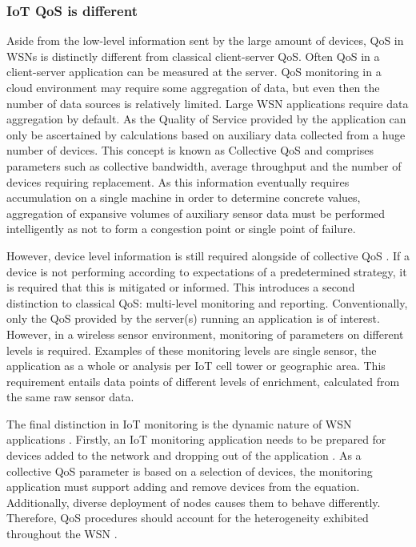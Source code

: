 \subsubsection{IoT QoS is different}
Aside from the low-level information sent by the large amount of devices, QoS in WSNs is distinctly different from classical client-server QoS. Often QoS in a client-server application can be measured at the server. QoS monitoring in a cloud environment may require some aggregation of data, but even then the number of data sources is relatively limited. Large WSN applications require data aggregation by default. As the Quality of Service provided by the application can only be ascertained by calculations based on auxiliary data collected from a huge number of devices. This concept is known as Collective QoS \cite{qos_specific_wsn} and comprises parameters such as collective bandwidth, average throughput and the number of devices requiring replacement. As this information eventually requires accumulation on a single machine in order to determine concrete values, aggregation of expansive volumes of auxiliary sensor data must be performed intelligently as not to form a congestion point or single point of failure.

However, device level information is still required alongside of collective QoS \cite{device_level}. If a device is not performing according to expectations of a predetermined strategy, it is required that this is mitigated or informed. This introduces a second distinction to classical QoS: multi-level monitoring and reporting. Conventionally, only the QoS provided by the server(s) running an application is of interest. However, in a wireless sensor environment, monitoring of parameters on different levels is required. Examples of these monitoring levels are single sensor, the application as a whole or analysis per IoT cell tower or geographic area. This requirement entails data points of different levels of enrichment, calculated from the same raw sensor data.

The final distinction in IoT monitoring is the dynamic nature of WSN applications \cite{popularity_applications_qos_moeilijk}. Firstly, an IoT monitoring application needs to be prepared for devices added to the network and dropping out of the application \cite{ontology}. As a collective QoS parameter is based on a selection of devices, the monitoring application must support adding and remove devices from the equation. Additionally, diverse deployment of nodes causes them to behave differently. Therefore, QoS procedures should account for the heterogeneity exhibited throughout the WSN \cite{energy_challenges}.

